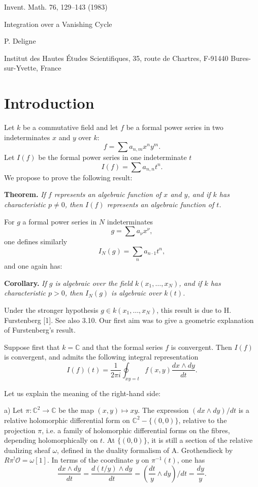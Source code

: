 \documentclass[11pt]{article}
\newcommand{\OO}{\mathcal O}
\newcommand{\CC}{\mathbb C}
\begin{document}
\begin{center}
{\large Invent. Math. 76, 129--143 (1983)}\par
\vspace{2.5em}
{\LARGE Integration over a Vanishing Cycle}\par
\vspace{1.2em}
{\large P. Deligne}\par
\vspace{0.5em}
Institut des Hautes Études Scientifiques, 35, route de Chartres, F-91440 Bures-sur-Yvette, France
\end{center}

\section*{Introduction}

Let $k$ be a commutative field and let $f$ be a formal power series in two indeterminates $x$ and $y$ over $k$:
\[
        f=\sum a_{n,m}x^ny^m.
\]
Let $I(f)$ be the formal power series in one indeterminate $t$
\[
        I(f)=\sum a_{n,n}t^n.
\]
We propose to prove the following result:

\medskip
\noindent\textbf{Theorem.} \emph{If $f$ represents an algebraic function of $x$ and $y$, and if $k$ has characteristic $p\ne0$, then $I(f)$ represents an algebraic function of $t$.}

\medskip
For $g$ a formal power series in $N$ indeterminates
\[
        g=\sum a_\nu x^\nu,
\]
one defines similarly
\[
        I_N(g)=\sum_n a_{n\cdot 1}t^n,
\]
and one again has:

\medskip
\noindent\textbf{Corollary.} \emph{If $g$ is algebraic over the field $k(x_1,\ldots,x_N)$, and if $k$ has characteristic $p>0$, then $I_N(g)$ is algebraic over $k(t)$.}

\medskip
Under the stronger hypothesis $g\in k(x_1,\ldots,x_N)$, this result is due to H. Furstenberg [1]. See also 3.10. Our first aim was to give a geometric explanation of Furstenberg's result.

Suppose first that $k=\CC$ and that the formal series $f$ is convergent. Then $I(f)$ is convergent, and admits the following integral representation
\begin{equation}
        I(f)(t)=\frac{1}{2\pi i}\oint_{xy=t}f(x,y)\frac{dx\wedge dy}{dt}. \tag{1}
\end{equation}

Let us explain the meaning of the right-hand side:

\medskip
\noindent a) Let $\pi:\CC^2\to\CC$ be the map $(x,y)\mapsto xy$. The expression $(dx\wedge dy)/dt$ is a relative holomorphic differential form on $\CC^2-\{(0,0)\}$, relative to the projection $\pi$, i.e. a family of holomorphic differential forms on the fibres, depending holomorphically on $t$. At $\{(0,0)\}$, it is still a section of the relative dualizing sheaf $\omega$, defined in the duality formalism of A. Grothendieck by $R\pi^!\OO=\omega[1]$. In terms of the coordinate $y$ on $\pi^{-1}(t)$, one has
\[
        \frac{dx\wedge dy}{dt}=\frac{d(t/y)\wedge dy}{dt}
        =\left(\frac{dt}{y}\wedge dy\right)/dt=\frac{dy}{y}.
\]
\end{document}
